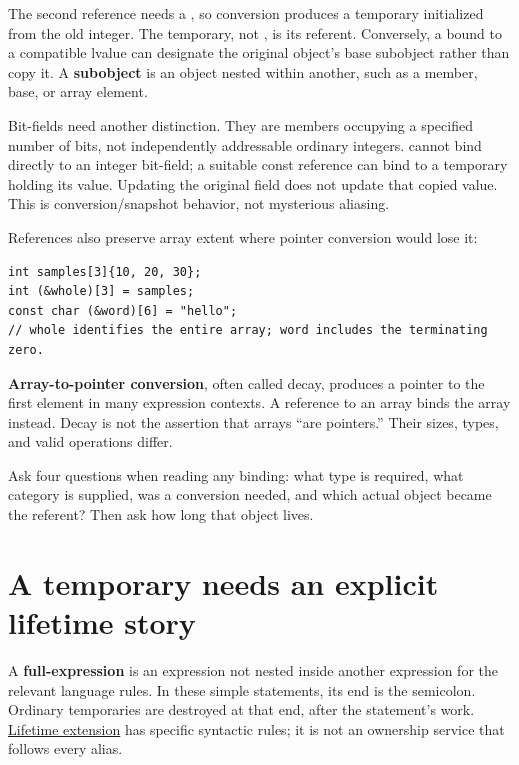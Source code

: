 The second reference needs a , so conversion produces a temporary  initialized from the old integer. The temporary, not , is its referent. Conversely, a  bound to a compatible  lvalue can designate the original object's base subobject rather than copy it. A \textbf{subobject} is an object nested within another, such as a member, base, or array element.

Bit-fields need another distinction. They are members occupying a specified number of bits, not independently addressable ordinary integers.  cannot bind directly to an integer bit-field; a suitable const reference can bind to a temporary holding its value. Updating the original field does not update that copied value. This is conversion/snapshot behavior, not mysterious aliasing.

References also preserve array extent where pointer conversion would lose it:

\begin{verbatim}
int samples[3]{10, 20, 30};
int (&whole)[3] = samples;
const char (&word)[6] = "hello";
// whole identifies the entire array; word includes the terminating zero.
\end{verbatim}

\textbf{Array-to-pointer conversion}, often called decay, produces a pointer to the first element in many expression contexts. A reference to an array binds the array instead. Decay is not the assertion that arrays ``are pointers.'' Their sizes, types, and valid operations differ.

Ask four questions when reading any binding: what type is required, what category is supplied, was a conversion needed, and which actual object became the referent? Then ask how long that object lives.

\section{A temporary needs an explicit lifetime story}\label{01-foundations-i-ch003-a-temporary-needs-an-explicit-lifetime-story}

\hypertarget{01-foundations-i-ch003-a-temporary-needs-an-explicit-lifetime-story}{}

A \textbf{full-expression} is an expression not nested inside another expression for the relevant language rules. In these simple statements, its end is the semicolon. Ordinary temporaries are destroyed at that end, after the statement's work. \hyperref[appendix-a978b29bbbb0]{Lifetime extension} has specific syntactic rules; it is not an ownership service that follows every alias.

